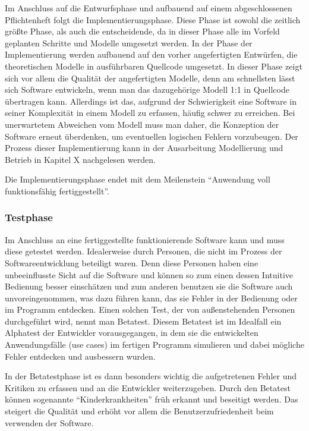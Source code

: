 Im Anschluss auf die Entwurfsphase und aufbauend auf einem abgeschlossenen
Pflichtenheft folgt die Implementierungsphase. Diese Phase ist sowohl die
zeitlich größte Phase, als auch die entscheidende, da in dieser Phase alle im
Vorfeld geplanten Schritte und Modelle umgesetzt werden. In der Phase der
Implementierung werden aufbauend auf den vorher angefertigten Entwürfen, die
theoretischen Modelle in ausführbaren Quellcode umgesetzt. In dieser Phase
zeigt sich vor allem die Qualität der angefertigten Modelle, denn am
schnellsten lässt sich Software entwickeln, wenn man das dazugehörige Modell
1:1 in Quellcode übertragen kann. Allerdings ist das, aufgrund der
Schwierigkeit eine Software in seiner Komplexität in einem Modell zu erfassen,
häufig schwer zu erreichen. Bei unerwartetem Abweichen vom Modell muss man
daher, die Konzeption der Software erneut überdenken, um eventuellen logischen
Fehlern vorzubeugen. Der Prozess dieser Implementierung kann in der
Ausarbeitung Modellierung und Betrieb in Kapitel X  nachgelesen werden.

Die Implementierungsphase endet mit dem Meilenstein "`Anwendung voll
funktionsfähig fertiggestellt"'.

\subsubsection{Testphase}
\label{sec:Testphase}

Im Anschluss an eine fertiggestellte funktionierende Software kann und muss
diese getestet werden. Idealerweise durch Personen, die nicht im Prozess der
Softwareentwicklung beteiligt waren. Denn diese Personen haben eine
unbeeinflusste Sicht auf die Software und können so zum einen dessen Intuitive
Bedienung besser einschätzen und zum anderen benutzen sie die Software auch
unvoreingenommen, was dazu führen kann, das sie Fehler in der Bedienung oder im
Programm entdecken. Einen solchen Test, der von außenstehenden Personen
durchgeführt wird, nennt man Betatest. Diesem Betatest ist im Idealfall ein
Alphatest der Entwickler vorausgegangen, in dem sie die entwickelten
Anwendungsfälle (use cases) im fertigen Programm simulieren und dabei mögliche
Fehler entdecken und ausbessern wurden.

In der Betatestphase ist es dann besonders wichtig die  aufgetretenen Fehler
und Kritiken zu erfassen und an die Entwickler weiterzugeben. Durch den
Betatest können sogenannte "`Kinderkrankheiten"' früh erkannt und beseitigt
werden. Das steigert die Qualität und erhöht vor allem die
Benutzerzufriedenheit beim verwenden der Software.

